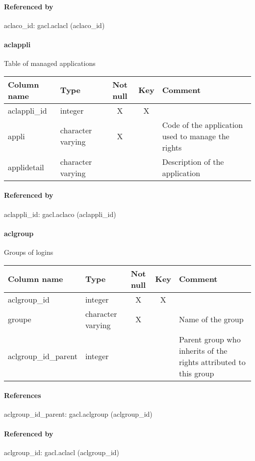 \paragraph{Referenced by}
aclaco\_id: gacl.aclacl (aclaco\_id)

\paragraph{aclappli}
Table of managed applications

\begin{tabular}{|l| p{2cm}|c|c| p{5cm}|}
\hline
Column name & Type & Not null & Key & Comment \\
\hline
aclappli\_id & integer & X & X & \\
appli & character varying & X &  & Code of the application used to manage the rights\\
applidetail & character varying &  &  & Description of the application\\
\hline
\end{tabular}
\paragraph{Referenced by}
aclappli\_id: gacl.aclaco (aclappli\_id)

\paragraph{aclgroup}
Groups of logins

\begin{tabular}{|l| p{2cm}|c|c| p{5cm}|}
\hline
Column name & Type & Not null & Key & Comment \\
\hline
aclgroup\_id & integer & X & X & \\
groupe & character varying & X &  & Name of the group\\
aclgroup\_id\_parent & integer &  &  & Parent group who inherits of the rights attributed to this group\\
\hline
\end{tabular}
\paragraph{References}
aclgroup\_id\_parent: gacl.aclgroup (aclgroup\_id)

\paragraph{Referenced by}
aclgroup\_id: gacl.aclacl (aclgroup\_id)

